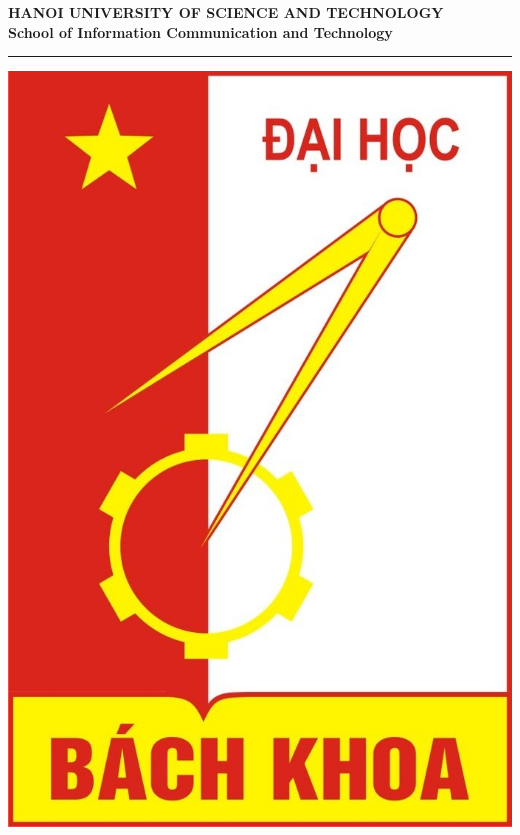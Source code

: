 \documentclass[3p, sort&compress, 12pt]{elsarticle}
\begin{document}
\captionsenglish
\dateUSenglish
\begin{center}
	\vspace*{-3cm}
	{\fontsize{16}{\baselineskip}\selectfont\sf\bfseries HANOI UNIVERSITY OF SCIENCE AND TECHNOLOGY}\\[15pt]	
	{\fontsize{18}{\baselineskip}\selectfont\sf\bfseries School of Information Communication and Technology}
	\begin{minipage}{0.6\linewidth}
		\rule{\linewidth}{1pt}
	\end{minipage}
	\vspace*{.5cm}
	\begin{center} 
		{\includegraphics[scale=0.15]{images/HUSTlogo.jpg}}
	\end{center}
	\vspace*{.3cm}
	

\end{center}
\end{document}
